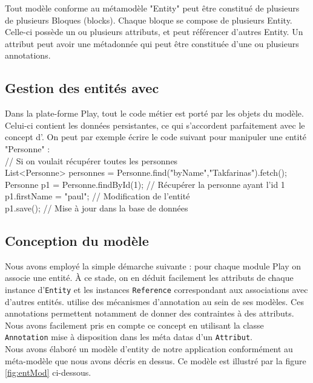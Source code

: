 Tout modèle conforme au métamodèle "Entity" peut être constitué de plusieurs de plusieurs Bloques (blocks). Chaque bloque se compose de plusieurs Entity. Celle-ci possède un ou plusieurs attributs, et peut référencer d'autres Entity. Un attribut peut avoir une métadonnée qui peut être constituée d'une ou plusieurs annotations.   

\subsection{Gestion des entités avec \kwplay{}}
Dans la plate-forme Play, tout le code métier est porté par les objets du modèle. Celui-ci contient les données persistantes, ce qui s'accordent parfaitement avec le concept d'\kwentity.  
On peut par exemple écrire le code suivant pour manipuler une entité "Personne" :\\
// Si on voulait récupérer toutes les personnes    \\
List<Personne> personnes = Personne.find("byName","Takfarinas").fetch();  \\
Personne p1 = Personne.findById(1);  // Récupérer la personne ayant l'id 1  \\
p1.firstName = "paul";  // Modification de l'entité  \\
p1.save(); // Mise à jour dans la base de données    
         

\subsection{Conception du modèle}
Nous avons employé la simple démarche suivante : pour chaque module Play on associe une entité. À ce stade, on en déduit facilement les attributs de chaque instance d'\verb+Entity+ et les instances \verb+Reference+ correspondant aux associations avec d'autres entités. \kwplay{} utilise des mécanismes d'annotation au sein de ses modèles. Ces annotations permettent notamment de donner des contraintes à des attributs. Nous avons facilement pris en compte ce concept en utilisant la classe \verb+Annotation+ mise à disposition dans les méta datas d'un \verb+Attribut+.\\
Nous avons élaboré un modèle d'entity de notre application conformément au méta-modèle que nous avons décris en dessus. Ce modèle est illustré par la figure \ref{fig:entMod} ci-dessous.


